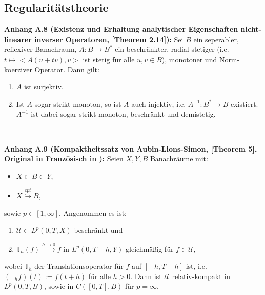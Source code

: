 \documentclass[
	language=german, %
	type=master, %
]{isthesis}
\begin{document}
\begin{appendix}
        \section{Regularitätstheorie}
\colorbox{generalYellow}{\begin{minipage}{16cm}{\textcolor{black}{}{\label{theoA.8}}}
\textbf{Anhang A.8 (Existenz und Erhaltung analytischer Eigenschaften nicht-linearer inverser Operatoren, \cite{roubivcek2013nonlinear}[Theorem 2.14]):} Sei \(B\) ein seperabler, reflexiver Banachraum, \(A:B \to B^*\) ein beschränkter, radial stetiger (i.e. \(t \mapsto <A(u+tv),v>\) ist stetig für alle \(u,v \in B\)), monotoner und Norm-koerziver Operator. Dann gilt:
\begin{enumerate}
    \item \(A\) ist surjektiv.
    \item Ist \(A\) sogar strikt monoton, so ist \(A\) auch injektiv, i.e. \(A^{-1} : B^* \to B\) existiert. \(A^{-1}\) ist dabei sogar strikt monoton, beschränkt und demistetig.
\end{enumerate}
\end{minipage}}\\

\colorbox{generalYellow}{\begin{minipage}{16cm}{\textcolor{black}{}{\label{theoA.9}}}
\textbf{Anhang A.9 (Kompaktheitssatz von Aubin-Lions-Simon, \cite{simon1986compact}[Theorem 5], Original in Französisch in \cite{simon1978ecoulement}):} Seien \(X,Y,B\) Banachräume mit:
\begin{itemize}
    \item \(X \subset B \subset Y\),
    \item \(X \stackrel{cpt}{\hookrightarrow} B\),
\end{itemize}
sowie \(p \in [1,\infty]\). Angenommen es ist:
\begin{enumerate}
    \item \(\mathcal{U} \subset L^p(0,T,X)\) beschränkt und
    \item \(\mathbb{T}_h(f) \stackrel{h \to 0}{\to} f\) in \(L^p(0,T-h,Y)\) gleichmäßig für \(f \in \mathcal{U}\),
\end{enumerate}
wobei \(\mathbb{T}_h\) der Translationsoperator für \(f\) auf \([-h,T-h]\) ist, i.e. \((\mathbb{T}_h f)(t) := f(t+h)\) für alle \(h > 0\).
Dann ist \(\mathcal{U}\) relativ-kompakt in \(L^p(0,T,B)\), sowie in \(C([0,T],B)\) für \(p = \infty\).
\end{minipage}}
     
     
     
     \end{appendix}
     
\end{document}
